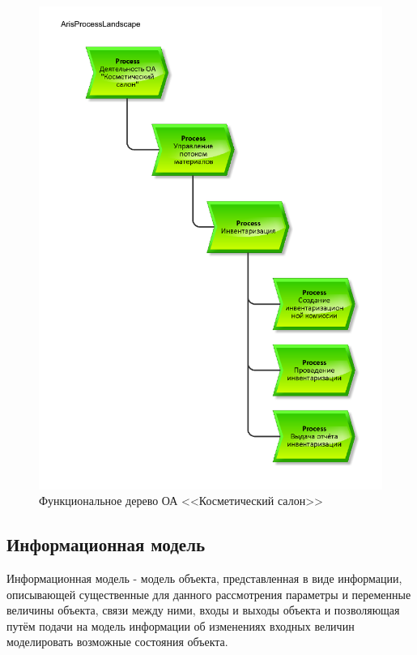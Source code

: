 \begin{figure}[!h]
    \centering

    \includegraphics[width=16cm]
    {assets/ARIS/ProcessLandscape/ArisProcessLandscape.pdf}

    \caption{Функциональное дерево ОА <<Косметический салон>>}

    \label{fig:ArisProcessLandscape}
\end{figure}

\newpage
\subsection{Информационная модель}
Информационная модель - модель объекта, представленная в виде информации,
описывающей существенные для данного рассмотрения параметры и переменные величины объекта,
связи между ними, входы и выходы объекта и позволяющая путём подачи на модель информации об изменениях
входных величин моделировать возможные состояния объекта.

